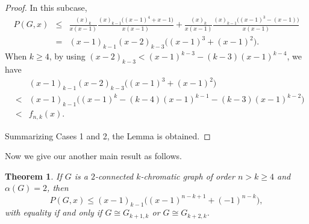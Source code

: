 \documentclass[12pt]{article}
\newtheorem{theorem}{Theorem}[section]
\theoremstyle{definition}
\begin{document}
\begin{proof}


In this subcase,
\begin{eqnarray*}P(G,x)&\leq &\frac{(x)_{k}}{x(x-1)}\frac{(x)_{k-1}\big((x-1)^4+x-1\big)}{x(x-1)}+\frac{(x)_{k}}{x(x-1)}\frac{(x)_{k-1}\big((x-1)^3-(x-1)\big)}{x(x-1)}\\
&=&(x-1)_{k-1}(x-2)_{k-3}\big((x-1)^3+(x-1)^2\big).
\end{eqnarray*}
When $k\geq 4$, by using $(x-2)_{k-3}<(x-1)^{k-3}-(k-3)(x-1)^{k-4}$, we have
\begin{eqnarray*}&&(x-1)_{k-1}(x-2)_{k-3}\big((x-1)^3+(x-1)^2\big)\\
&<&(x-1)_{k-1}\big((x-1)^k-(k-4)(x-1)^{k-1}-(k-3)(x-1)^{k-2}\big)\\
&<&f_{n,k}(x).
\end{eqnarray*}

Summarizing Cases 1 and 2, the Lemma is obtained.
\end{proof}

Now we give our another main result as follows.

\begin{theorem}\label{t3} If $G$ is a $2$-connected $k$-chromatic graph of order $n>k\geq 4$ and $\alpha(G)=2$, then $$P(G,x)\leq(x-1)_{k-1}\big((x-1)^{n-k+1}+(-1)^{n-k}\big),$$ with equality if and only if $G\cong G_{k+1,k}$ or $G\cong G_{k+2,k}$.
\end{theorem}
\end{document}
